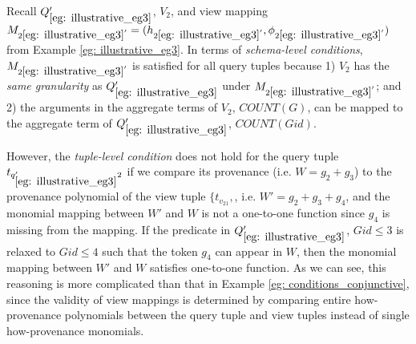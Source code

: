 \begin{example}
Recall $Q_{\ref{eg: illustrative_eg3}}'$, $V_2$, and view mapping $M_{2\ref{eg: illustrative_eg3}'}=(h_{2\ref{eg: illustrative_eg3}'},\phi_{2\ref{eg: illustrative_eg3}'})$ from Example \ref{eg: illustrative_eg3}. In terms of {\em schema-level conditions}, $M_{2\ref{eg: illustrative_eg3}'}$ is satisfied for all query tuples because 1) $V_2$ has the {\em same granularity} as $Q_{\ref{eg: illustrative_eg3}}'$ under $M_{2\ref{eg: illustrative_eg3}'}$; and 2) the arguments in the aggregate terms of $V_2$, $COUNT(G)$, can be mapped to the aggregate term of $Q_{\ref{eg: illustrative_eg3}}'$, $COUNT(Gid)$.

However, the {\em tuple-level condition} does not hold for the query tuple $t_{q_{\ref{eg: illustrative_eg3}}'2}$ if we compare its provenance (i.e. $W = g_2 + g_3$) to the provenance polynomial of the view tuple $\{t_{v_21}, $, i.e.
$W' = g_2 + g_3 + g_4$, and the monomial mapping between $W'$ and $W$ is not a one-to-one function since $g_4$ is missing from the mapping. If the predicate in $Q_{\ref{eg: illustrative_eg3}}'$, $Gid \leq 3$ is relaxed to $Gid \leq 4$ such that the token $g_4$ can appear in $W$, then the monomial mapping between $W'$ and $W$ satisfies one-to-one function. As we can see, this reasoning is more complicated than that in Example \ref{eg: conditions_conjunctive}, since the validity of view mappings is determined by comparing entire how-provenance polynomials between the query tuple and view tuples instead of single how-provenance monomials.



\end{example}
